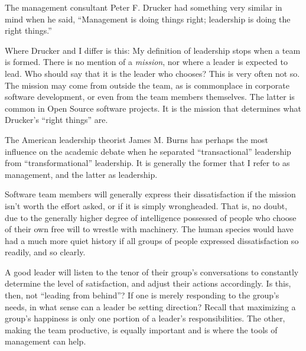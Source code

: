 \vspace{20pt}
\setlength{\fboxsep}{10pt}%

The management consultant Peter F. Drucker had something very similar in mind when he said, ``Management is doing things right; leadership is doing the right things.''

Where Drucker and I differ is this: My definition of leadership stops when a team is formed. There is no mention of a \textit{mission}, nor where a leader is expected to lead. Who should say that it is the leader who chooses? This is very often not so. The mission may come from outside the team, as is commonplace in corporate software development, or even from the team members themselves. The latter is common in Open Source software projects. It is the mission that determines what Drucker's ``right things'' are.

The American leadership theorist James M. Burns has perhaps the most influence on the academic debate when he separated ``transactional'' leadership from ``transformational'' leadership\cite{Burns-1978}. It is generally the former that I refer to as management, and the latter as leadership.

Software team members will generally express their dissatisfaction if the mission isn't worth the effort asked, or if it is simply wrongheaded. That is, no doubt, due to the generally higher degree of intelligence possessed of people who choose of their own free will to wrestle with machinery. The human species would have had a much more quiet history if all groups of people expressed dissatisfaction so readily, and so clearly.

A good leader will listen to the tenor of their group's conversations to constantly determine the level of satisfaction, and adjust their actions accordingly. Is this, then, not ``leading from behind''? If one is merely responding to the group's needs, in what sense can a leader be setting direction? Recall that maximizing a group's happiness is only one portion of a leader's responsibilities. The other, making the team productive, is equally important and is where the tools of management can help.


